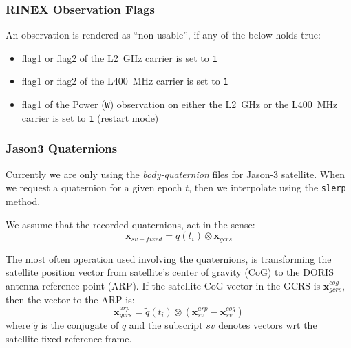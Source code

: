 \subsubsection{RINEX Observation Flags}
\label{sssec:rnx-flags}
An observation is rendered as ``non-usable'', if any of the below holds true:
\begin{itemize}
  \item flag1 or flag2 of the L\SI{2}{\giga\hertz} carrier is set to \texttt{1}
  \item flag1 or flag2 of the L\SI{400}{\mega\hertz} carrier is set to \texttt{1}
  \item flag1 of the Power (\texttt{W}) observation on either the L\SI{2}{\giga\hertz} 
    or the L\SI{400}{\mega\hertz} carrier is set to \texttt{1} (restart mode)
\end{itemize}

\subsubsection{Jason3 Quaternions}
\label{sssec:ja3-quaternions}
Currently we are only using the \emph{body-quaternion} files for Jason-3 
satellite. When we request a quaternion for a given epoch $t$, then we interpolate 
using the \texttt{slerp} method. 

We assume that the recorded quaternions, act in the sense:
\begin{equation}
  \bm{x}_{sv-fixed} = q(t_i) \otimes \bm{x}_{gcrs}
\end{equation}

The most often operation used involving the quaternions, is transforming the 
satellite position vector from satellite's center of gravity (CoG) to the 
DORIS antenna reference point (ARP). If the satellite CoG vector in the GCRS 
is $\bm{x}^{cog}_{gcrs}$, then the vector to the ARP is:
\begin{equation}
  \bm{x}^{arp}_{gcrs} = \tilde{q}(t_i) \otimes (\bm{x}^{arp}_{sv} - \bm{x}^{cog}_{sv})
\end{equation}
where $\tilde{q}$ is the conjugate of $q$ and the subscript $sv$ denotes vectors 
wrt the satellite-fixed reference frame.

